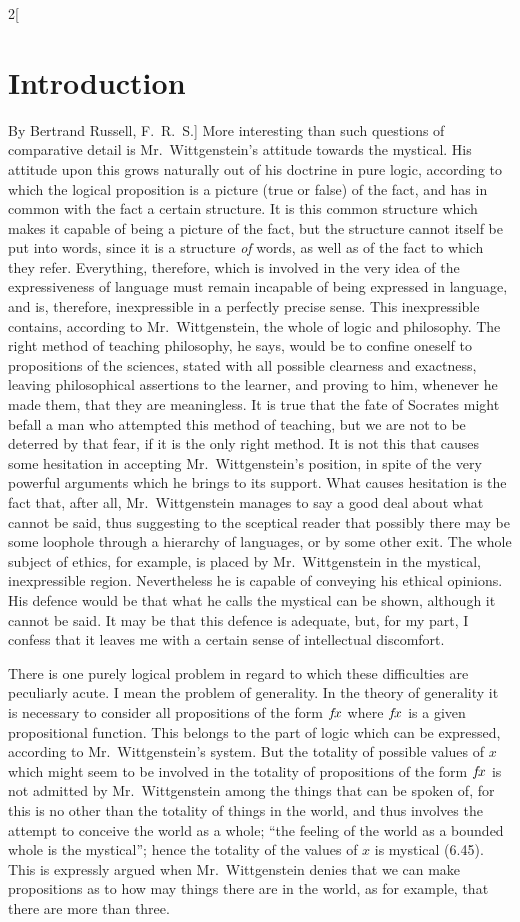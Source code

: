 \documentclass[oneside,openany,12pt]{book}
\begin{document}
\begin{multicols}{2}[\section*{Introduction}By Bertrand Russell, F.\ R.\ S.]
More interesting than such questions of comparative detail is Mr.\ Wittgenstein's attitude towards the mystical. His attitude upon this grows naturally out of his doctrine in pure logic, according to which the logical proposition is a picture (true or false) of the fact, and has in common with the fact a certain structure. It is this common structure which makes it capable of being a picture of the fact, but the structure cannot itself be put into words, since it is a structure \emph{of} words, as well as of the fact to which they refer. Everything, therefore, which is involved in the very idea of the expressiveness of language must remain incapable of being expressed in language, and is, therefore, inexpressible in a perfectly precise sense. This inexpressible contains, according to Mr.\ Wittgenstein, the whole of logic and philosophy. The right method of teaching philosophy, he says, would be to confine oneself to propositions of the sciences, stated with all possible clearness and exactness, leaving philosophical assertions to the learner, and proving to him, whenever he made them, that they are meaningless. It is true that the fate of Socrates might befall a man who attempted this method of teaching, but we are not to be deterred by that fear, if it is the only right method. It is not this that causes some hesitation in accepting Mr.\ Wittgenstein's position, in spite of the very powerful arguments which he brings to its support. What causes hesitation is the fact that, after all, Mr.\ Wittgenstein manages to say a good deal about what cannot be said, thus suggesting to the sceptical reader that possibly there may be some loophole through a hierarchy of languages, or by some other exit. The whole subject of ethics, for example, is placed by Mr.\ Wittgenstein in the mystical, inexpressible region. Nevertheless he is capable of conveying his ethical opinions. His defence would be that what he calls the mystical can be shown, although it cannot be said. It may be that this defence is adequate, but, for my part, I confess that it leaves me with a certain sense of intellectual discomfort.

There is one purely logical problem in regard to which these difficulties are peculiarly acute. I mean the problem of generality. In the theory of generality it is necessary to consider all propositions of the form $f\negthinspace x$ where $f\negthinspace x$ is a given propositional function. This belongs to the part of logic which can be expressed, according to Mr.\ Wittgenstein's system. But the totality of possible values of $x$ which might seem to be involved in the totality of propositions of the form $f\negthinspace x$ is not admitted by Mr.\ Wittgenstein among the things that can be spoken of, for this is no other than the totality of things in the world, and thus involves the attempt to conceive the world as a whole; ``the feeling of the world as a bounded whole is the mystical''; hence the totality of the values of $x$ is mystical (6.45). This is expressly argued when Mr.\ Wittgenstein denies that we can make propositions as to how may things there are in the world, as for example, that there are more than three.


\end{multicols}
\end{document}
